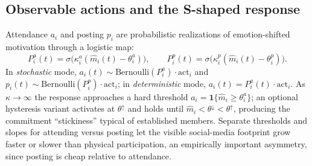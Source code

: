 \documentclass[11pt]{article}
\begin{document}
\subsection{Observable actions and the S-shaped response}\label{sec:actions}
Attendance $a_i$ and posting $p_i$ are probabilistic realizations of emotion-shifted motivation through a logistic map:
\begin{equation}\tag{A}\label{eq:actions}
P^a_i(t)=\sigma\!\big(\kappa^a_i(\hat m_i(t)-\theta^a_i)\big),\qquad
P^p_i(t)=\sigma\!\big(\kappa^p_i(\hat m_i(t)-\theta^p_i)\big).
\end{equation}
In \emph{stochastic} mode, $a_i(t)\sim\mathrm{Bernoulli}(P^a_i)\cdot\mathrm{act}_i$ and $p_i(t)\sim\mathrm{Bernoulli}(P^p_i)\cdot\mathrm{act}_i$; in \emph{deterministic} mode, $a_i(t)=P^a_i(t)\cdot\mathrm{act}_i$. As $\kappa\to\infty$ the response approaches a hard threshold $a_i=\mathbf 1\{\hat m_i\ge\theta^a_i\}$; an optional hysteresis variant activates at $\theta^{\uparrow}$ and holds until $\hat m_i<\theta^{\downarrow}<\theta^{\uparrow}$, producing the commitment ``stickiness'' typical of established members. Separate thresholds and slopes for attending versus posting let the visible social-media footprint grow faster or slower than physical participation, an empirically important asymmetry, since posting is cheap relative to attendance.
\end{document}
